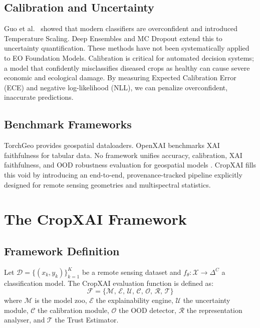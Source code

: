 \documentclass[10pt,journal]{IEEEtran}
\begin{document}
\subsection{Calibration and Uncertainty}
Guo et al.\ \cite{guo2017calibration} showed that modern classifiers are
overconfident and introduced Temperature Scaling. Deep Ensembles
\cite{lakshminarayanan2017ensembles} and MC Dropout \cite{gal2016dropout}
extend this to uncertainty quantification. These methods have not been
systematically applied to EO Foundation Models. 
Calibration is critical for automated decision systems; a model that confidently misclassifies diseased crops as healthy can cause severe economic and ecological damage. By measuring Expected Calibration Error (ECE) and negative log-likelihood (NLL), we can penalize overconfident, inaccurate predictions.

\subsection{Benchmark Frameworks}
TorchGeo \cite{stewart2022torchgeo} provides geospatial dataloaders.
OpenXAI \cite{agarwal2022openxai} benchmarks XAI faithfulness for tabular
data. No framework unifies accuracy, calibration, XAI faithfulness, and OOD
robustness evaluation for geospatial models \cite{liang2023helm, muennighoff2023mteb}. CropXAI fills this void by introducing an end-to-end, provenance-tracked pipeline explicitly designed for remote sensing geometries and multispectral statistics.

\section{The CropXAI Framework}

\subsection{Framework Definition}
Let $\mathcal{D} = \{(x_k, y_k)\}_{k=1}^K$ be a remote sensing dataset
and $f_\theta : \mathcal{X} \to \Delta^C$ a classification model. The
CropXAI evaluation function is defined as:
\begin{equation}
\mathcal{F} = \{\mathcal{M},\, \mathcal{E},\, \mathcal{U},\,
\mathcal{C},\, \mathcal{O},\, \mathcal{R},\, \mathcal{T}\}
\end{equation}
where $\mathcal{M}$ is the model zoo, $\mathcal{E}$ the explainability
engine, $\mathcal{U}$ the uncertainty module, $\mathcal{C}$ the
calibration module, $\mathcal{O}$ the OOD detector, $\mathcal{R}$ the
representation analyser, and $\mathcal{T}$ the Trust Estimator.
\end{document}
